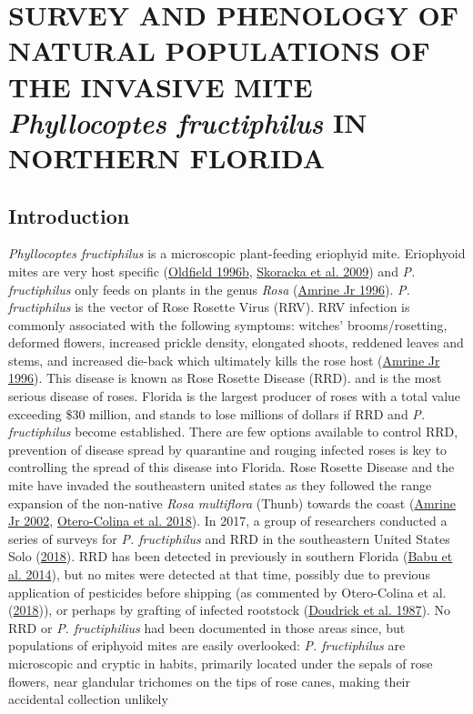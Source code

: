 \documentclass{ufdissertation}[overrideChapters] %
\begin{document}
{{\chapter{\texorpdfstring{SURVEY AND PHENOLOGY OF NATURAL POPULATIONS OF THE INVASIVE MITE \emph{Phyllocoptes fructiphilus} IN NORTHERN FLORIDA}{SURVEY AND PHENOLOGY OF NATURAL POPULATIONS OF THE INVASIVE MITE Phyllocoptes fructiphilus IN NORTHERN FLORIDA}}\label{survey-and-phenology-of-natural-populations-of-the-invasive-mite-phyllocoptes-fructiphilus-in-northern-florida}}

\hypertarget{introduction}{%
\section{Introduction}\label{introduction}}

\emph{Phyllocoptes fructiphilus} is a microscopic plant-feeding eriophyid mite. Eriophyoid mites are very host specific (\protect\hyperlink{ref-Oldfield1996c}{Oldfield 1996b}, \protect\hyperlink{ref-Skoracka2009}{Skoracka et al. 2009}) and \emph{P. fructiphilus} only feeds on plants in the genus \emph{Rosa} (\protect\hyperlink{ref-Amrine1996}{Amrine Jr 1996}). \emph{P. fructiphilus} is the vector of Rose Rosette Virus (RRV). RRV infection is commonly associated with the following symptoms: witches' brooms/rosetting, deformed flowers, increased prickle density, elongated shoots, reddened leaves and stems, and increased die-back which ultimately kills the rose host (\protect\hyperlink{ref-Amrine1996}{Amrine Jr 1996}). This disease is known as Rose Rosette Disease (RRD). and is the most serious disease of roses. Florida is the largest producer of roses with a total value exceeding \$30 million, and stands to lose millions of dollars if RRD and \emph{P. fructiphilus} become established. There are few options available to control RRD, prevention of disease spread by quarantine and rouging infected roses is key to controlling the spread of this disease into Florida. Rose Rosette Disease and the mite have invaded the southeastern united states as they followed the range expansion of the non-native \emph{Rosa multiflora} (Thunb) towards the coast (\protect\hyperlink{ref-Amrine2002}{Amrine Jr 2002}, \protect\hyperlink{ref-Otero-Colina2018}{Otero-Colina et al. 2018}). In 2017, a group of researchers conducted a series of surveys for \emph{P. fructiphilus} and RRD in the southeastern United States Solo (\protect\hyperlink{ref-Solo2018}{2018}). RRD has been detected in previously in southern Florida (\protect\hyperlink{ref-Babu2014}{Babu et al. 2014}), but no mites were detected at that time, possibly due to previous application of pesticides before shipping (as commented by Otero-Colina et al. (\protect\hyperlink{ref-Otero-Colina2018}{2018})), or perhaps by grafting of infected rootstock (\protect\hyperlink{ref-Doudrick1987}{Doudrick et al. 1987}). No RRD or \emph{P. fructiphilius} had been documented in those areas since, but populations of eriphyoid mites are easily overlooked: \emph{P. fructiphilus} are microscopic and cryptic in habits, primarily located under the sepals of rose flowers, near glandular trichomes on the tips of rose canes, making their accidental collection unlikely }
\end{document}
